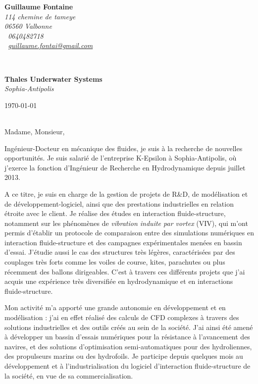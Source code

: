 \documentclass[11pt]{article}
\begin{document}
\sffamily   %
\hfill%
\begin{minipage}[t]{.6\textwidth}
\raggedleft%
{\bfseries Guillaume Fontaine}\\[.35ex]
\small\itshape%
114 chemine de tameye\\
06560 Valbonne\\[.35ex]
\Telefon~0640482718\\
\Letter~\href{mailto:guillaume.fontai@gmail.com}{guillaume.fontai@gmail.com}
\end{minipage}\\[1em]
%
\begin{minipage}[t]{.4\textwidth}
\raggedright%
{\bfseries Thales Underwater Systems}\\[.35ex]
\small\itshape%
Sophia-Antipolis\\
\end{minipage}
\hfill %
\begin{minipage}[t]{.4\textwidth}
\raggedleft %
\today
\end{minipage}\\[2em]
Madame, Monsieur,

Ingénieur-Docteur en mécanique des fluides, je suis à la recherche de nouvelles opportunités. Je suis salarié de l'entreprise K-Epsilon à Sophia-Antipolis, où j'exerce la fonction d'Ingénieur de Recherche en Hydrodynamique depuis juillet 2013.

A ce titre, je suis en charge de la gestion de projets de R\&D, de modélisation et de développement-logiciel, ainsi que des prestations industrielles en relation étroite avec le client. Je réalise des études en interaction fluide-structure, notamment sur les phénomènes de \textit{vibration induite par vortex} (VIV), qui m'ont permis d'établir un protocole de comparaison entre des simulations numériques en interaction fluide-structure et des campagnes expérimentales menées en bassin d'essai. J'étudie aussi le cas des structures très légères, caractérisées par des couplages très forts comme les voiles de course, kites, parachutes ou plus récemment des ballons dirigeables. C'est à travers ces différents projets que j'ai acquis une expérience très diversifiée en hydrodynamique et en interactions fluide-structure.

Mon activité m'a apporté une grande autonomie en développement et en modélisation : j'ai en effet réalisé des calculs de CFD complexes à travers des solutions industrielles et des outils créés au sein de la société. J'ai ainsi été amené à développer un bassin d'essais numériques pour la résistance à l'avancement des navires, et des solutions d'optimisation semi-automatiques pour des hydroliennes, des propulseurs marins ou des hydrofoils. Je participe depuis quelques mois au développement et à l'industrialisation du logiciel d'interaction fluide-structure de la société, en vue de sa commercialisation.
\end{document}

